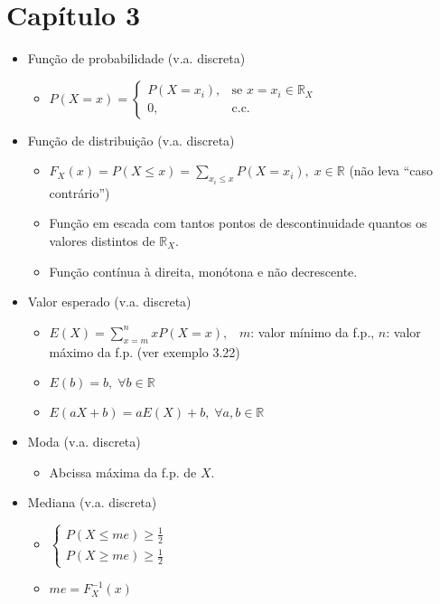 \documentclass[a4paper]{report}
\newcommand{\espaco}{\;\;\;}
\begin{document}
	\section*{Capítulo 3}
	\begin{itemize}
		\item Função de probabilidade (v.a. discreta)
		\begin{itemize}
			\item $P(X=x)=\begin{cases}
			P(X=x_i),&\text{se } x=x_i\in\mathbb R_X\\
			0,&\text{c.c.}
			\end{cases}$
		\end{itemize}
		\item Função de distribuição (v.a. discreta)
		\begin{itemize}
			\item $F_X(x)=P(X\leq x)=\sum_{x_i\leq x}P(X=x_i),\;x\in\mathbb R$ (não leva ``caso contrário'')
			\item Função em escada com tantos pontos de descontinuidade quantos os valores distintos de $\mathbb R_X$.
			\item Função contínua à direita, monótona e não decrescente.
		\end{itemize}
		\item Valor esperado (v.a. discreta)
		\begin{itemize}
			\item $E(X)=\sum_{x=m}^n xP(X=x),\espaco m$: valor mínimo da f.p., $n$: valor máximo da f.p. (ver exemplo 3.22)
			\item $E(b)=b,\;\forall b\in\mathbb R$
			\item $E(aX+b)=aE(X)+b,\;\forall a,b \in \mathbb R$
		\end{itemize}
		\item Moda (v.a. discreta)
		\begin{itemize}
			\item Abcissa máxima da f.p. de $X$.
		\end{itemize}
		\item Mediana (v.a. discreta)
		\begin{itemize}
			\item $\begin{cases}
			P(X\leq me)\geq \frac 1 2\\
			P(X\geq me)\geq \frac 1 2
			\end{cases}$
			\item $me=F_X^{-1}(x)$
		\end{itemize}

\end{itemize}
\end{document}
